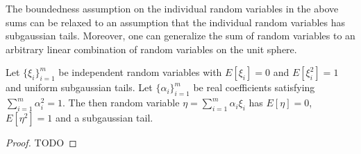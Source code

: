  The boundedness assumption on the individual random variables in the
above sums can be relaxed to an assumption that the individual random
variables has subgaussian tails.  Moreover, one can generalize the sum
of random variables to an arbitrary linear combination of random
variables on the unit sphere.

\begin{lem}\label{Matousek} Let $\{\xi_i\}_{i=1}^m$ be independent
  random variables with $E[\xi_i]=0$ and $E[\xi_i^2]=1$ and uniform
  subgaussian tails.  Let $\{\alpha_i\}_{i=1}^m$ be real coefficients
satisfying $\sum_{i=1}^m \alpha_i^2 = 1$.  The then random variable
$\eta=\sum_{i=1}^m \alpha_i\xi_i$ has $E[\eta]=0$, $E[\eta^2]=1$ and a
subgaussian tail.
\end{lem}
\begin{proof}
TODO
\end{proof}


